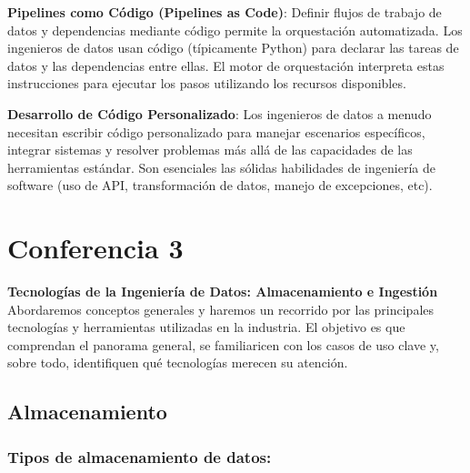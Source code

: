 \documentclass[12pt]{book}
\begin{document}
\textbf{Pipelines como Código (Pipelines as Code)}: Definir flujos de trabajo de datos y dependencias mediante código permite la orquestación automatizada. Los ingenieros de datos usan código (típicamente Python) para declarar las tareas de datos y las dependencias entre ellas. El motor de orquestación interpreta estas instrucciones para ejecutar los pasos utilizando los recursos disponibles.

\textbf{Desarrollo de Código Personalizado}: Los ingenieros de datos a menudo necesitan escribir código personalizado para manejar escenarios específicos, integrar sistemas y resolver problemas más allá de las capacidades de las herramientas estándar. Son esenciales las sólidas habilidades de ingeniería de software (uso de API, transformación de datos, manejo de excepciones, etc).

\chapter{Conferencia 3}
\normalfont\LARGE \textbf{Tecnologías de la Ingeniería de Datos: Almacenamiento e Ingestión}
\normalfont\small\\

Abordaremos conceptos generales y haremos un recorrido por las principales tecnologías y herramientas utilizadas en la industria.
El objetivo es que comprendan el panorama general, se familiaricen con los casos de uso clave y, sobre todo, identifiquen qué tecnologías merecen su atención.

\section{Almacenamiento}
\subsection{Tipos de almacenamiento de datos:}
\end{document}
